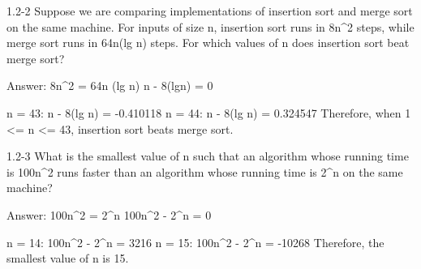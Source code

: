 1.2-2
Suppose we are comparing implementations of insertion sort and merge sort on the same machine. For inputs of size n, insertion sort runs in 8n^2 steps, while merge sort runs in 64n(lg n) steps. For which values of n does insertion sort beat merge sort?

Answer:
  8n^2 = 64n (lg n)
  n - 8(lgn) = 0
  
  n = 43:  n - 8(lg n) = -0.410118
  n = 44:  n - 8(lg n) =  0.324547
  Therefore, when 1 <= n <= 43, insertion sort beats merge sort.

1.2-3
What is the smallest value of n such that an algorithm whose running time is 100n^2 runs faster than an algorithm whose running time is 2^n on the same machine?

Answer:
  100n^2 = 2^n
  100n^2 - 2^n = 0
  
  n = 14: 100n^2 - 2^n = 3216
  n = 15: 100n^2 - 2^n = -10268
  Therefore, the smallest value of n is 15.
